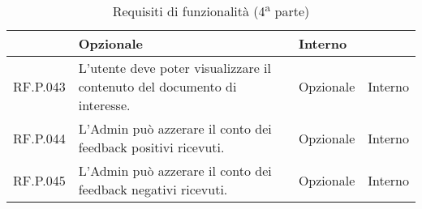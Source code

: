 \begin{table}[H]
\begin{tabular}{|C{2.7cm}|L{7.2cm}|C{2.7cm}|C{2cm}|}
         & Opzionale & Interno \\
        \hline
        RF.P.043 & L’utente deve poter visualizzare il contenuto del documento di interesse.
         & Opzionale & Interno \\
        \hline
        RF.P.044 & L'Admin può azzerare il conto dei feedback positivi ricevuti.
         & Opzionale & Interno \\
        \hline
        RF.P.045 & L'Admin può azzerare il conto dei feedback negativi ricevuti.
         & Opzionale & Interno \\
        \hline
    \end{tabular}
    \caption{Requisiti di funzionalità (4\textsuperscript{a}  parte)}
\end{table}

\newpage